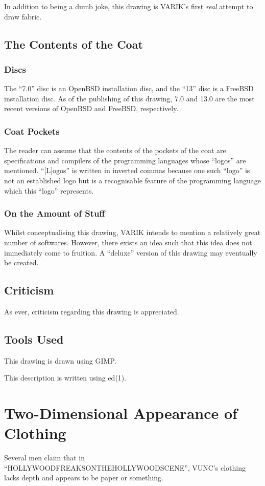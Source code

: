 \documentclass{report}
\begin{document}
In addition to being a dumb joke, this drawing is VARIK's first \textit{real} attempt to draw fabric.
\subsection{The Contents of the Coat}
\subsubsection{Discs}
The ``7.0'' disc is an OpenBSD installation disc, and the ``13'' disc is a FreeBSD installation disc.  As of the publishing of this drawing, 7.0 and 13.0 are the most recent versions of OpenBSD and FreeBSD, respectively.
\subsubsection{Coat Pockets}
The reader can assume that the contents of the pockets of the coat are specifications and compilers of the programming languages whose ``logos'' are mentioned.  ``[L]ogos'' is written in inverted commas because one such ``logo'' is not an established logo but is a recognisable feature of the programming language which this ``logo'' represents.
\subsubsection{On the Amount of Stuff}
Whilst conceptualising this drawing, VARIK intends to mention a relatively great number of softwares.  However, there exists an idea such that this idea does not immediately come to fruition.  A ``deluxe'' version of this drawing may eventually be created.
\subsection{Criticism}
As ever, criticism regarding this drawing is appreciated.
\subsection{Tools Used}
This drawing is drawn using GIMP\@.

This description is written using ed(1).
\section{Two-Dimensional Appearance of Clothing}
Several men claim that in ``HOLLYWOODFREAKSONTHEHOLLYWOODSCENE'', VUNC's clothing lacks depth and appears to be paper or something.
\end{document}
